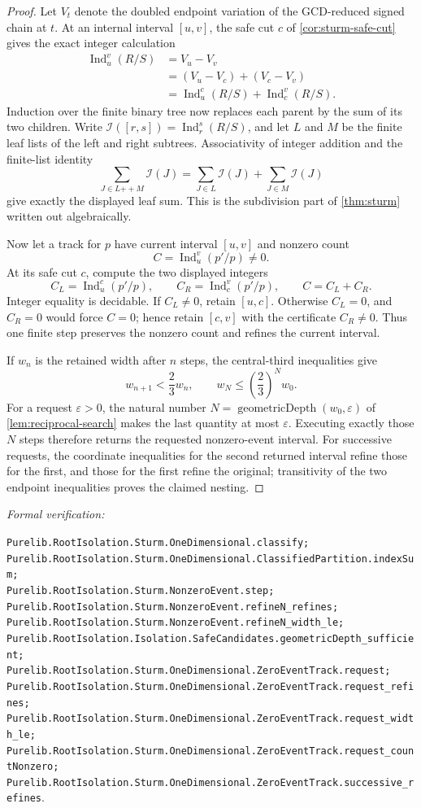 \documentclass[11pt]{article}
\newcommand{\Ind}{\operatorname{Ind}}
\newcommand{\eps}{\varepsilon}
\newcommand{\leanref}[1]{\par\smallskip\noindent
  \emph{Formal verification:}\par\nobreak
  {\raggedright\nolinkurl{#1}.\par}}
\begin{document}
\begin{proof}
Let $V_t$ denote the doubled endpoint variation of the GCD-reduced signed
chain at $t$.  At an internal interval $[u,v]$, the safe cut $c$ of
\cref{cor:sturm-safe-cut} gives the exact integer calculation
\[
\begin{aligned}
 \Ind_u^v(R/S)
   &=V_u-V_v\\
   &=(V_u-V_c)+(V_c-V_v)\\
   &=\Ind_u^c(R/S)+\Ind_c^v(R/S).
\end{aligned}
\]
Induction over the finite binary tree now replaces each parent by the sum of
its two children.  Write
$\mathcal I([r,s])=\Ind_r^s(R/S)$, and let $L$ and $M$ be the finite leaf
lists of the left and right subtrees.  Associativity of integer addition and
the finite-list identity
\[
 \sum_{J\in L\mathbin{++}M}\mathcal I(J)
   =\sum_{J\in L}\mathcal I(J)+\sum_{J\in M}\mathcal I(J)
\]
give exactly the displayed leaf sum.  This is the subdivision part of
\cref{thm:sturm} written out algebraically.

Now let a track for $p$ have current interval $[u,v]$ and nonzero count
\[
                         C=\Ind_u^v(p'/p)\ne0.
\]
At its safe cut $c$, compute the two displayed integers
\[
 C_L=\Ind_u^c(p'/p),\qquad C_R=\Ind_c^v(p'/p),
 \qquad C=C_L+C_R.
\]
Integer equality is decidable.  If $C_L\ne0$, retain $[u,c]$.  Otherwise
$C_L=0$, and $C_R=0$ would force $C=0$; hence retain $[c,v]$ with the
certificate $C_R\ne0$.  Thus one finite step preserves the nonzero count
and refines the current interval.

If $w_n$ is the retained width after $n$ steps, the central-third
inequalities give
\[
                 w_{n+1}<\frac23w_n,
 \qquad          w_N\le\left(\frac23\right)^Nw_0.
\]
For a request $\eps>0$, the natural number
$N=\operatorname{geometricDepth}(w_0,\eps)$ of
\cref{lem:reciprocal-search} makes the last quantity at most $\eps$.
Executing exactly those $N$ steps therefore
returns the requested nonzero-event interval.  For successive requests,
the coordinate inequalities for the second returned interval refine those
for the first, and those for the first refine the original; transitivity of
the two endpoint inequalities proves the claimed nesting.
\end{proof}

\leanref{Purelib.RootIsolation.Sturm.OneDimensional.classify;
Purelib.RootIsolation.Sturm.OneDimensional.ClassifiedPartition.indexSum;
Purelib.RootIsolation.Sturm.NonzeroEvent.step;
Purelib.RootIsolation.Sturm.NonzeroEvent.refineN_refines;
Purelib.RootIsolation.Sturm.NonzeroEvent.refineN_width_le;
Purelib.RootIsolation.Isolation.SafeCandidates.geometricDepth_sufficient;
Purelib.RootIsolation.Sturm.OneDimensional.ZeroEventTrack.request;
Purelib.RootIsolation.Sturm.OneDimensional.ZeroEventTrack.request_refines;
Purelib.RootIsolation.Sturm.OneDimensional.ZeroEventTrack.request_width_le;
Purelib.RootIsolation.Sturm.OneDimensional.ZeroEventTrack.request_countNonzero;
Purelib.RootIsolation.Sturm.OneDimensional.ZeroEventTrack.successive_refines}
\end{document}
